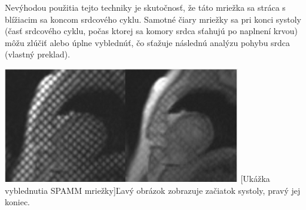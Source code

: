 Nevýhodou použitia tejto techniky je skutočnosť, že táto mriežka sa stráca s blížiacim sa koncom srdcového cyklu. Samotné čiary mriežky sa pri konci systoly (časť srdcového cyklu, počas ktorej sa komory srdca sťahujú po naplnení krvou) môžu zlúčiť alebo úplne vyblednúť, čo sťažuje následnú analýzu pohybu srdca \cite{spamm_description} (vlastný preklad).

\begin {center}
        \centering
        \includegraphics[height=5cm]{media/heart/early_late_systole.png}
        \captionsetup{justification=centering}
        [Ukážka vyblednutia SPAMM mriežky]{Ľavý obrázok zobrazuje začiatok systoly, pravý jej koniec.}
\end {center}

\clearpage